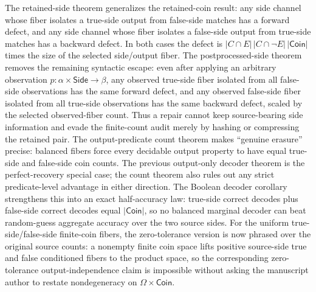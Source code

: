 \documentclass[11pt]{article}
\theoremstyle{remark}
\begin{document}
The retained-side theorem generalizes the retained-coin result: any side
channel whose fiber isolates a true-side output from false-side matches has a
forward defect, and any side channel whose fiber isolates a false-side output
from true-side matches has a backward defect.  In both cases the defect is
\(|C\cap E|\,|C\cap\neg E|\,|\mathsf{Coin}|\) times the size of the selected
side/output fiber.  The postprocessed-side theorem removes the remaining
syntactic escape: even after applying an arbitrary observation
\(p:\alpha\times\mathsf{Side}\to\beta\), any observed true-side fiber isolated
from all false-side observations has the same forward defect, and any observed
false-side fiber isolated from all true-side observations has the same backward
defect, scaled by the selected observed-fiber count.  Thus a repair cannot keep
source-bearing side information and evade the finite-count audit merely by
hashing or compressing the retained pair.  The output-predicate count theorem
makes ``genuine erasure'' precise:
balanced fibers force every decidable output property to have equal true-side
and false-side coin counts.  The previous output-only decoder theorem is the
perfect-recovery special case; the count theorem also rules out any strict
predicate-level advantage in either direction.  The Boolean decoder corollary
strengthens this into an exact half-accuracy law: true-side correct decodes
plus false-side correct decodes equal \(|\mathsf{Coin}|\), so no balanced
marginal decoder can beat random-guess aggregate accuracy over the two source
sides.
For the uniform true-side/false-side finite-coin fibers, the zero-tolerance
version is now phrased over the original source counts: a nonempty finite coin
space lifts positive source-side true and false conditioned fibers to the
product space, so the corresponding zero-tolerance output-independence claim is
impossible without asking the manuscript author to restate nondegeneracy on
\(\Omega\times\mathsf{Coin}\).
\end{document}
